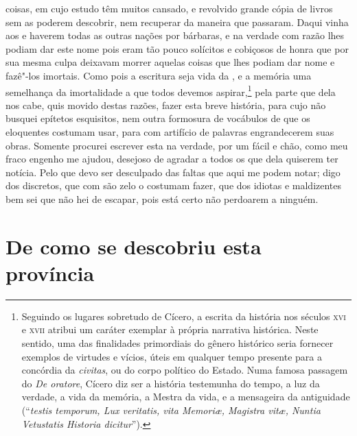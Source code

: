 coisas, em cujo estudo têm muitos  cansado, e revolvido
grande cópia de livros sem as poderem descobrir, nem recuperar da
maneira que passaram. Daqui vinha aos  e  haverem todas as
outras nações por bárbaras, e na verdade com razão lhes podiam dar este			%
nome pois eram tão pouco solícitos e cobiçosos de honra que por sua
mesma culpa deixavam morrer aquelas coisas que lhes podiam dar nome e
fazê"-los imortais. Como pois a escritura seja vida da , e a
memória uma semelhança da imortalidade a que todos devemos
aspirar,\footnote{ Seguindo os lugares sobretudo de Cícero, a escrita da
história nos séculos \textsc{xvi} e \textsc{xvii} atribui um caráter exemplar à própria
narrativa histórica. Neste sentido, uma das finalidades primordiais do
gênero histórico seria fornecer exemplos de virtudes e vícios, úteis em
qualquer tempo presente para a concórdia da \textit{civitas}, ou do corpo
político do Estado. Numa famosa passagem do \textit{De oratore}, 
Cícero diz ser a história testemunha do tempo, a luz da verdade, a vida
da memória, a Mestra da vida, e a mensageira da antiguidade (``\textit{testis
temporum, Lux veritatis, vita Memori\ae, Magistra vit\ae, Nuntia
Vetustatis Historia dicitur}'').} pela parte que dela nos cabe, quis
movido destas razões, fazer esta breve história, para cujo 
não busquei epítetos esquisitos, nem outra formosura de vocábulos de
que os eloquentes  costumam usar, para com artifício de
palavras engrandecerem suas obras. Somente procurei escrever esta na
verdade, por um  fácil e chão, como meu fraco engenho me ajudou,       %
desejoso de agradar a todos os que dela quiserem ter notícia. Pelo que
devo ser desculpado das faltas que aqui me podem notar; digo dos
discretos, que com são zelo o costumam fazer, que dos idiotas e
maldizentes bem sei que não hei de escapar, pois está certo não perdoarem a ninguém.



\chapter[De como se descobriu esta província]{De como se
descobriu esta província}							%



